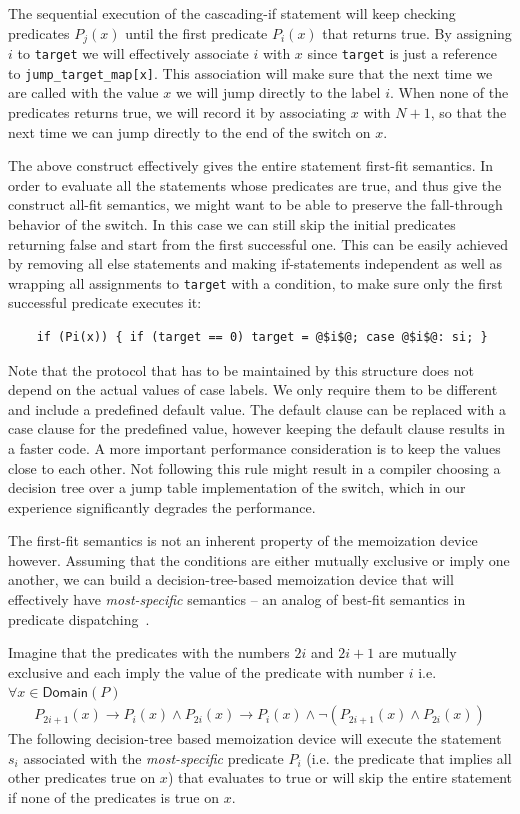 \documentclass[preprint]{sigplanconf}
\makeatletter
\DeclareRobustCommand{\code}[1]{{\lstinline[breaklines=false,escapechar=@]{#1}}}
\makeatother
\begin{document}
The sequential execution of the cascading-if statement will keep checking 
predicates $P_j(x)$ until the first predicate $P_i(x)$ that returns true. By 
assigning $i$ to \code{target} we will effectively associate $i$ with $x$ since 
\code{target} is just a reference to \code{jump_target_map[x]}. This association 
will make sure that the next time we are called with the value $x$ we will jump 
directly to the label $i$. When none of the predicates returns true, we will 
record it by associating $x$ with $N+1$, so that the next time we can jump 
directly to the end of the switch on $x$. 

The above construct effectively gives the entire statement first-fit semantics. 
In order to evaluate all the statements whose predicates are true, and thus 
give the construct all-fit semantics, we might want to be able to preserve the 
fall-through behavior of the switch. In this case we can still skip the initial 
predicates returning false and start from the first successful one. This can be 
easily achieved by removing all else statements and making if-statements 
independent as well as wrapping all assignments to \code{target} with a condition, 
to make sure only the first successful predicate executes it:

\begin{lstlisting}
    if (Pi(x)) { if (target == 0) target = @$i$@; case @$i$@: si; }
\end{lstlisting}

\noindent
Note that the protocol that has to be maintained by this structure does not 
depend on the actual values of case labels. We only require them to be 
different and include a predefined default value. The default clause can be 
replaced with a case clause for the predefined value, however keeping the default  
clause results in a faster code. A more important performance consideration is to 
keep the values close to each other. Not following this rule might result in a 
compiler choosing a decision tree over a jump table implementation of the 
switch, which in our experience significantly degrades the performance.

The first-fit semantics is not an inherent property of the memoization device however. 
Assuming that the conditions are either mutually exclusive or imply one another, we 
can build a decision-tree-based memoization device that will effectively have 
\emph{most-specific} semantics -- an analog of best-fit semantics in predicate 
dispatching~\cite{ErnstKC98}.

Imagine that the predicates with the numbers $2i$ and $2i+1$ are mutually exclusive and 
each imply the value of the predicate with number $i$ i.e. $\forall x \in \mathsf{Domain}(P)$
\begin{eqnarray*}
P_{2i+1}(x)\rightarrow P_i(x) \wedge P_{2i}(x)\rightarrow P_i(x) \wedge \neg(P_{2i+1}(x) \wedge P_{2i}(x))
\end{eqnarray*}
\noindent
The following decision-tree based memoization device will execute the statement 
$s_i$ associated with the \emph{most-specific} predicate $P_i$ (i.e. the 
predicate that implies all other predicates true on $x$) that evaluates to true or will 
skip the entire statement if none of the predicates is true on $x$.
\end{document}
